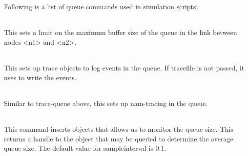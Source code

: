Following is a list of queue commands used in simulation scripts:
\begin{flushleft}
\\
This sets a limit on the maximum buffer size of the queue in the link between
nodes <n1> and <n2>.


\\
This sets up trace objects to log events in the queue. If tracefile is not
passed, it uses  to write the events.


\\
Similar to trace-queue above, this sets up nam-tracing in the queue.


\\
This command inserts objects that allows us to monitor the queue size. This
returns a handle to the object that may be queried to determine the average
queue size. The default value for sampleinterval is 0.1.


\end{flushleft}



\endinput
